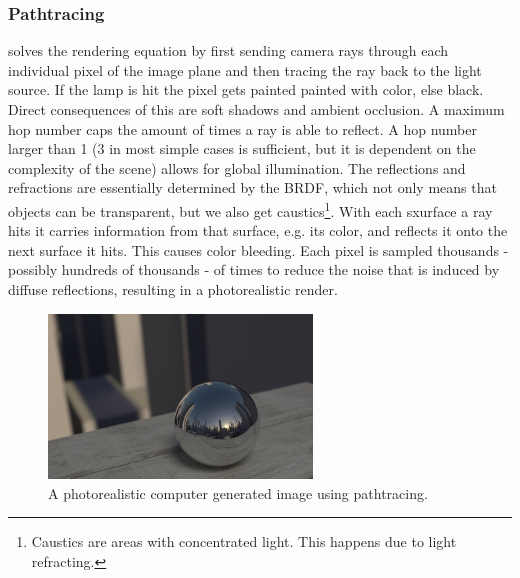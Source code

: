 \documentclass{ACGSeminar}
\begin{document}
	\subsubsection{Pathtracing} 
		solves the rendering equation by first sending camera rays through each individual pixel of the image plane and then tracing the ray back to the light source. If the lamp is hit the pixel gets painted painted with color, else black. Direct consequences of this are soft shadows and ambient occlusion. A maximum hop number caps the amount of times a ray is able to reflect. A hop number larger than 1 (3 in most simple cases is sufficient, but it is dependent on the complexity of the scene) allows for global illumination. The reflections and refractions are essentially determined by the BRDF, which not only means that objects can be transparent, but we also get caustics\footnote{Caustics are areas with concentrated light. This happens due to light refracting.}. With each sxurface a ray hits it carries information from that surface, e.g. its color, and reflects it onto the next surface it hits. This causes color bleeding. Each pixel is sampled thousands - possibly hundreds of thousands - of times to reduce the noise that is induced by diffuse reflections, resulting in a photorealistic render.
		\begin{figure}[htb!]%
			\begin{center}%
				\includegraphics[width=7cm]{img/pathtracing.png}
			\end{center}%
			\caption{A photorealistic computer generated image using pathtracing.}%
			\label{fig:pathtracing}%
		\end{figure}%
\end{document}
